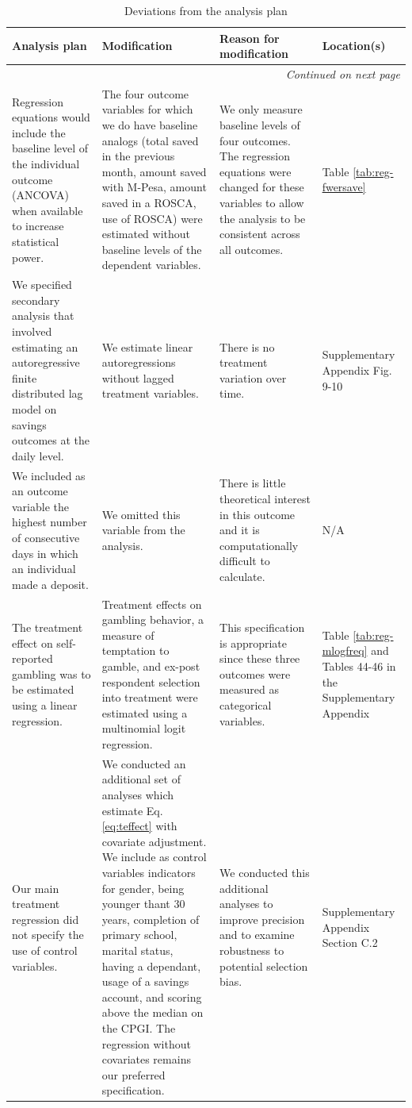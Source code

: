 \documentclass[12pt]{article}
\begin{document}
	\begin{landscape}
	
		\begin{longtable}{p{}p{}p{}p{}}
			\caption{Deviations from the analysis plan} \label{tab:deviations} \\
			\toprule
			Analysis plan & Modification & Reason for modification & Location(s) \\
			\midrule
			\endhead
			\hline \multicolumn{4}{r}{\textit{Continued on next page}} \\
			\endfoot
			\bottomrule
			\endlastfoot
			Regression equations would include the baseline level of the individual outcome (ANCOVA) when available to increase statistical power. & The four outcome variables for which we do have baseline analogs (total saved in the previous month, amount saved with M-Pesa, amount saved in a ROSCA, use of ROSCA) were estimated without baseline levels of the dependent variables. & We only measure baseline levels of four outcomes. The regression equations were changed for these variables to allow the analysis to be consistent across all outcomes. & Table \ref{tab:reg-fwersave} \\
			\midrule
			We specified secondary analysis that involved estimating an autoregressive finite distributed lag model on savings outcomes at the daily level. & We estimate linear autoregressions without lagged treatment variables. & There is no treatment variation over time. & Supplementary Appendix Fig. 9-10 \\
			\midrule
			We included as an outcome variable the highest number of consecutive days in which an individual made a deposit. & We omitted this variable from the analysis. & There is little theoretical interest in this outcome and it is computationally difficult to calculate. & N/A \\
			\midrule
			The treatment effect on self-reported gambling was to be estimated using a linear regression. & Treatment effects on gambling behavior, a measure of temptation to gamble, and ex-post respondent selection into treatment were estimated using a multinomial logit regression. & This specification is appropriate since these three outcomes were measured as categorical variables. & Table \ref{tab:reg-mlogfreq} and Tables 44-46 in the Supplementary Appendix \\
			\midrule
			Our main treatment regression did not specify the use of control variables. & We conducted an additional set of analyses which estimate Eq. \ref{eq:teffect} with covariate adjustment. We include as control variables indicators for gender, being younger thant 30 years, completion of primary school, marital status, having a dependant, usage of a savings account, and scoring above the median on the CPGI. The regression without covariates remains our preferred specification. & We conducted this additional analyses to improve precision and to examine robustness to potential selection bias. & Supplementary Appendix Section C.2 \\

\end{longtable}
\end{landscape}
\end{document}
